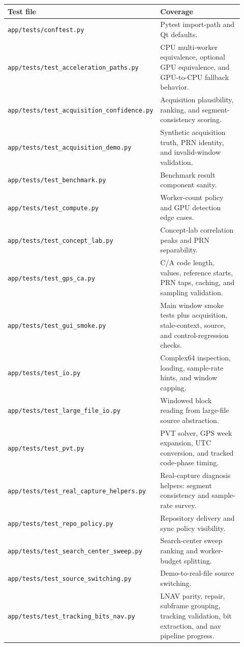 \documentclass[11pt,a4paper]{article}
\newcommand{\codepath}[1]{\nolinkurl{#1}}
\begin{document}
\begin{longtable}{P{0.36\linewidth}L{0.56\linewidth}}
\textbf{Test file} & \textbf{Coverage}\\
\hline
\codepath{app/tests/conftest.py} & Pytest import-path and Qt defaults.\\
\codepath{app/tests/test_acceleration_paths.py} & CPU multi-worker equivalence, optional GPU equivalence, and GPU-to-CPU fallback behavior.\\
\codepath{app/tests/test_acquisition_confidence.py} & Acquisition plausibility, ranking, and segment-consistency scoring.\\
\codepath{app/tests/test_acquisition_demo.py} & Synthetic acquisition truth, PRN identity, and invalid-window validation.\\
\codepath{app/tests/test_benchmark.py} & Benchmark result component sanity.\\
\codepath{app/tests/test_compute.py} & Worker-count policy and GPU detection edge cases.\\
\codepath{app/tests/test_concept_lab.py} & Concept-lab correlation peaks and PRN separability.\\
\codepath{app/tests/test_gps_ca.py} & C/A code length, values, reference starts, PRN taps, caching, and sampling validation.\\
\codepath{app/tests/test_gui_smoke.py} & Main window smoke tests plus acquisition, stale-context, source, and control-regression checks.\\
\codepath{app/tests/test_io.py} & Complex64 inspection, loading, sample-rate hints, and window capping.\\
\codepath{app/tests/test_large_file_io.py} & Windowed block reading from large-file source abstraction.\\
\codepath{app/tests/test_pvt.py} & PVT solver, GPS week expansion, UTC conversion, and tracked code-phase timing.\\
\codepath{app/tests/test_real_capture_helpers.py} & Real-capture diagnosis helpers: segment consistency and sample-rate survey.\\
\codepath{app/tests/test_repo_policy.py} & Repository delivery and sync policy visibility.\\
\codepath{app/tests/test_search_center_sweep.py} & Search-center sweep ranking and worker-budget splitting.\\
\codepath{app/tests/test_source_switching.py} & Demo-to-real-file source switching.\\
\codepath{app/tests/test_tracking_bits_nav.py} & LNAV parity, repair, subframe grouping, tracking validation, bit extraction, and nav pipeline progress.\\
\end{longtable}
\end{document}
